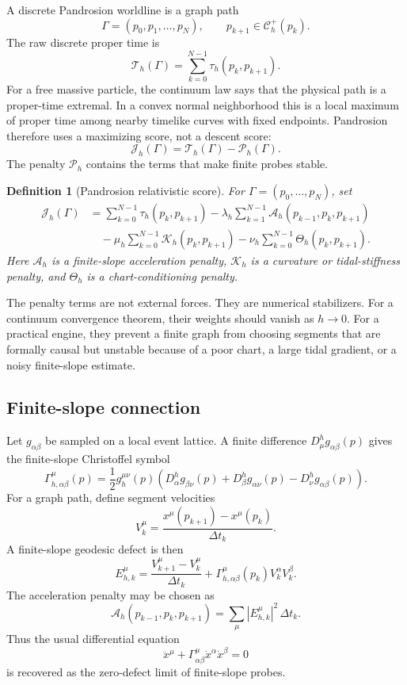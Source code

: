\documentclass[11pt]{article}
\newtheorem{definition}{Definition}[section]
\newcommand{\A}{\mathcal A}
\newcommand{\Cset}{\mathcal C}
\newcommand{\J}{\mathcal J}
\newcommand{\K}{\mathcal K}
\newcommand{\Pset}{\mathcal P}
\newcommand{\T}{\mathcal T}
\begin{document}
A discrete Pandrosion worldline is a graph path
\[
        \Gamma=(p_0,p_1,\ldots,p_N),
        \qquad p_{k+1}\in\Cset_h^+(p_k).
\]
The raw discrete proper time is
\[
        \T_h(\Gamma)
        =
        \sum_{k=0}^{N-1}\tau_h(p_k,p_{k+1}).
\]
For a free massive particle, the continuum law says that the physical path is
a proper-time extremal.  In a convex normal neighborhood this is a local
maximum of proper time among nearby timelike curves with fixed endpoints.
Pandrosion therefore uses a maximizing score, not a descent score:
\[
        \J_h(\Gamma)
        =
        \T_h(\Gamma)-\Pset_h(\Gamma).
\]
The penalty \(\Pset_h\) contains the terms that make finite probes stable.

\begin{definition}[Pandrosion relativistic score]
For \(\Gamma=(p_0,\ldots,p_N)\), set
\[
\begin{aligned}
        \J_h(\Gamma)
        &=
        \sum_{k=0}^{N-1}\tau_h(p_k,p_{k+1})
        -
        \lambda_h\sum_{k=1}^{N-1}
        \A_h(p_{k-1},p_k,p_{k+1})
\\
        &\quad
        -
        \mu_h\sum_{k=0}^{N-1}
        \K_h(p_k,p_{k+1})
        -
        \nu_h\sum_{k=0}^{N-1}
        \Theta_h(p_k,p_{k+1}).
\end{aligned}
\]
Here \(\A_h\) is a finite-slope acceleration penalty, \(\K_h\) is a curvature
or tidal-stiffness penalty, and \(\Theta_h\) is a chart-conditioning penalty.
\end{definition}

The penalty terms are not external forces.  They are numerical stabilizers.
For a continuum convergence theorem, their weights should vanish as
\(h\to0\).  For a practical engine, they prevent a finite graph from choosing
segments that are formally causal but unstable because of a poor chart, a
large tidal gradient, or a noisy finite-slope estimate.

\subsection{Finite-slope connection}

Let \(g_{\alpha\beta}\) be sampled on a local event lattice.  A finite
difference \(D^h_\mu g_{\alpha\beta}(p)\) gives the finite-slope Christoffel
symbol
\[
        \Gamma_{h,\alpha\beta}^{\mu}(p)
        =
        \frac12 g_h^{\mu\nu}(p)
        \left(
        D^h_\alpha g_{\beta\nu}(p)
        +
        D^h_\beta g_{\alpha\nu}(p)
        -
        D^h_\nu g_{\alpha\beta}(p)
        \right).
\]
For a graph path, define segment velocities
\[
        V_k^\mu
        =
        \frac{x^\mu(p_{k+1})-x^\mu(p_k)}{\Delta t_k}.
\]
A finite-slope geodesic defect is then
\[
        E^\mu_{h,k}
        =
        \frac{V_{k+1}^\mu-V_k^\mu}{\Delta t_k}
        +
        \Gamma_{h,\alpha\beta}^{\mu}(p_k)V_k^\alpha V_k^\beta.
\]
The acceleration penalty may be chosen as
\[
        \A_h(p_{k-1},p_k,p_{k+1})
        =
        \sum_{\mu}|E^\mu_{h,k}|^2\,\Delta t_k.
\]
Thus the usual differential equation
\[
        \ddot x^\mu+\Gamma^\mu_{\alpha\beta}\dot x^\alpha\dot x^\beta=0
\]
is recovered as the zero-defect limit of finite-slope probes.
\end{document}
